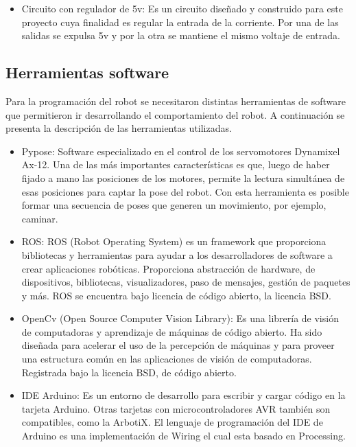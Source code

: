 \begin{itemize}
\item Circuito con regulador de 5v: Es un circuito diseñado y construido para este proyecto cuya finalidad es regular la entrada de la corriente. Por una de las salidas se expulsa 5v y por la otra se mantiene el mismo voltaje de entrada. 
\end{itemize}





\subsection{Herramientas software }

Para la programación del robot se necesitaron distintas herramientas de software que permitieron ir desarrollando el comportamiento del robot. A continuación se presenta la descripción de las herramientas utilizadas. 

\begin{itemize}
\item Pypose: Software especializado en el control de los servomotores Dynamixel Ax-12. Una de las más importantes características es que, luego de haber fijado a mano las posiciones de los motores, permite la lectura simultánea de esas posiciones para captar la pose del robot. Con esta herramienta es posible formar una secuencia de poses que generen un movimiento, por ejemplo, caminar. \cite{pypose}

\item ROS: ROS (Robot Operating System) es un framework que proporciona bibliotecas y herramientas para ayudar a los desarrolladores de software a crear aplicaciones robóticas. Proporciona abstracción de hardware,  de dispositivos, bibliotecas, visualizadores, paso de mensajes, gestión de paquetes y más. ROS se encuentra bajo licencia de código abierto, la licencia BSD.

\item OpenCv (Open Source Computer Vision Library): Es una librería de visión de computadoras y aprendizaje de máquinas de código abierto. Ha sido diseñada para acelerar el uso de la percepción de m\'aquinas y para proveer una estructura común en las aplicaciones de visión de computadoras. Registrada bajo la licencia BSD, de código abierto. \cite{opencv}

\item IDE Arduino: Es un entorno de desarrollo para escribir y cargar código en la tarjeta Arduino. Otras tarjetas con microcontroladores AVR también son compatibles, como la ArbotiX. El lenguaje de programación del IDE de Arduino es una implementación de Wiring el cual esta basado en Processing.  \cite{arduino}

\end{itemize}

